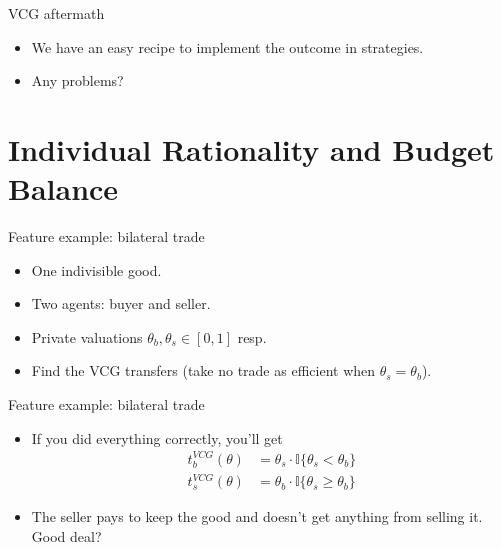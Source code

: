 \documentclass[english,10pt
,aspectratio=169
,handout
]{beamer}
\begin{document}
\begin{frame}{VCG aftermath}
\begin{itemize}
	\item We have an easy recipe to implement the  outcome in  strategies.
	\item Any problems?
\end{itemize}
\end{frame}


\section{Individual Rationality and Budget Balance}

\begin{frame}{Feature example: bilateral trade}
\begin{example}
	\begin{itemize}
		\item One indivisible good.
		\item Two agents: buyer and seller. 
		\item Private valuations $\theta_b,\theta_s \in [0,1]$ resp.
		\item Find the VCG transfers (take no trade as efficient when $\theta_s = \theta_b$).
	\end{itemize}
\end{example}
\end{frame}


\begin{frame}{Feature example: bilateral trade}
\begin{itemize}
	\item If you did everything correctly, you'll get
	\begin{align*}
		t_b^{VCG}(\theta) &= \theta_s \cdot \mathbb{I} \{ \theta_s < \theta_b \} 
		\\ t_s^{VCG}(\theta) &= \theta_b \cdot \mathbb{I} \{ \theta_s \geq \theta_b \} 
	\end{align*}
	\pause
	\item The seller pays to keep the good and doesn't get anything from selling it. Good deal?
\end{itemize}
\end{frame}
\end{document}
